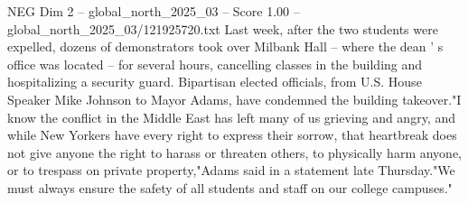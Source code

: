 \begin{textsample}{NEG Dim 2 – global\_north\_2025\_03 – Score 1.00 – global\_north\_2025\_03/121925720.txt}
Last week, after the two students were expelled, dozens of demonstrators took over Milbank Hall -- where the dean ' s office was located -- for several hours, cancelling classes in the building and hospitalizing a security guard.
Bipartisan elected officials, from U.S.
House Speaker Mike Johnson to Mayor Adams, have condemned the building takeover."I know the conflict in the Middle East has left many of us grieving and angry, and while New Yorkers have every right to express their sorrow, that heartbreak does not give anyone the right to harass or threaten others, to physically harm anyone, or to trespass on private property,"Adams said in a statement late Thursday."We must always ensure the safety of all students and staff on our college campuses."

\end{textsample}

